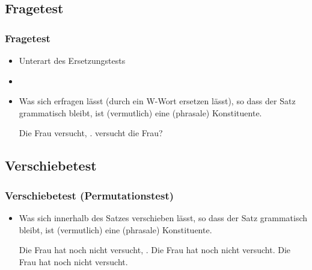 \subsection{Fragetest}

\begin{frame}
\frametitle{Fragetest}

\begin{itemize}
	\item Unterart des Ersetzungstests
	\item[]
	\item Was sich erfragen lässt (durch ein W-Wort ersetzen lässt), so dass der Satz grammatisch bleibt, ist (vermutlich) eine (phrasale) Konstituente.

	\eal 
	\zl

\pause	
	\eal 
	\ex Die Frau versucht, .
	\ex \alertred{[Was]} versucht die Frau?
	\zl
	
\end{itemize}

\end{frame}


\subsection{Verschiebetest}

\begin{frame}
\frametitle{Verschiebetest (Permutationstest)}

\begin{itemize}
	\item Was sich innerhalb des Satzes verschieben lässt, so dass der Satz grammatisch bleibt, ist (vermutlich) eine (phrasale) Konstituente.

	\eal 
	\zl

\pause	
	\eal 
	\ex Die Frau hat noch nicht versucht, .
	\ex Die Frau hat  noch nicht versucht.
	\ex Die Frau hat noch nicht  versucht.
	\zl

\end{itemize}

\end{frame}


